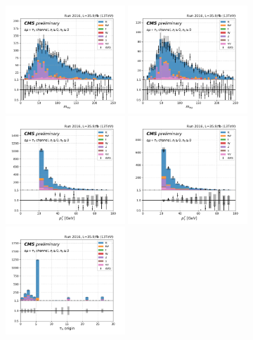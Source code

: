 \begin{figure}
    \centering
    \includegraphics[width=0.4\textwidth]{chapters/Appendix/sectionJetToTauh/figures/emutau_dilepton_mass_pickles_lltauTight.png}
    \includegraphics[width=0.4\textwidth]{chapters/Appendix/sectionJetToTauh/figures/emutau_dilepton_mass_pickles_lltauVTight.png}
    \includegraphics[width=0.4\textwidth]{chapters/Appendix/sectionJetToTauh/figures/emutau_tauPt_pickles_lltauTight.png}
    \includegraphics[width=0.4\textwidth]{chapters/Appendix/sectionJetToTauh/figures/emutau_tauPt_pickles_lltauVTight.png}
    \includegraphics[width=0.4\textwidth]{chapters/Appendix/sectionJetToTauh/figures/emutau_tauGenFlavor_pickles_lltauTight.png}

\end{figure}
